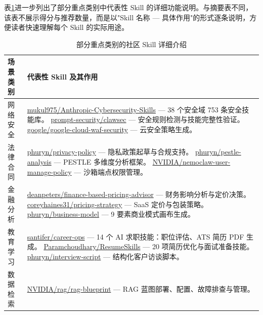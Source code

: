 \documentclass[UTF8,a4paper,12pt]{ctexart}
\begin{document}
表\ref{tab:community-detail}进一步列出了部分重点类别中代表性 Skill 的详细功能说明。与摘要表不同，该表不展示得分与推荐数量，而是以"Skill 名称 — 具体作用"的形式逐条说明，方便读者快速理解每个 Skill 的实际用途。

\begin{table}[H]
\centering
\caption{部分重点类别的社区 Skill 详细介绍}
\label{tab:community-detail}
\small
\begin{tabularx}{\textwidth}{p{2.8cm} X}
\toprule
场景类别 & 代表性 Skill 及其作用 \\
\midrule
网络安全 & \href{https://github.com/mukul975/Anthropic-Cybersecurity-Skills}{mukul975/Anthropic-Cybersecurity-Skills} — 38 个安全域 753 条安全技能库。
  \newline \href{https://github.com/prompt-security/clawsec}{prompt-security/clawsec} — 安全规则检测与技能完整性验证。
  \newline \href{https://github.com/google/skills/tree/main/skills/cloud/google-cloud-waf-security}{google/google-cloud-waf-security} — 云安全策略生成。\\
\addlinespace
法律合同 & \href{https://github.com/phuryn/pm-skills/tree/main/pm-toolkit/skills/privacy-policy}{phuryn/privacy-policy} — 隐私政策起草与合规支持。
  \newline \href{https://github.com/phuryn/pm-skills/tree/main/pm-product-strategy/skills/pestle-analysis}{phuryn/pestle-analysis} — PESTLE 多维度分析框架。
  \newline \href{https://github.com/NVIDIA/skills/tree/main/skills/NemoClaw/nemoclaw-user-manage-policy}{NVIDIA/nemoclaw-user-manage-policy} — 沙箱端点权限管理。\\
\addlinespace
金融分析 & \href{https://github.com/deanpeters/Product-Manager-Skills/tree/main/skills/finance-based-pricing-advisor}{deanpeters/finance-based-pricing-advisor} — 财务影响分析与定价决策。
  \newline \href{https://github.com/coreyhaines31/marketingskills/tree/main/skills/pricing-strategy}{coreyhaines31/pricing-strategy} — SaaS 定价与包装策略。
  \newline \href{https://github.com/phuryn/pm-skills/tree/main/pm-product-strategy/skills/business-model}{phuryn/business-model} — 9 要素商业模式画布生成。\\
\addlinespace
教育学习 & \href{https://github.com/santifer/career-ops}{santifer/career-ops} — 14 个 AI 求职技能：职位评估、ATS 简历 PDF 生成。
  \newline \href{https://github.com/Paramchoudhary/ResumeSkills}{Paramchoudhary/ResumeSkills} — 20 项简历优化与面试准备技能。
  \newline \href{https://github.com/phuryn/pm-skills/tree/main/pm-product-discovery/skills/interview-script}{phuryn/interview-script} — 结构化客户访谈脚本。\\
\addlinespace
数据检索 & \href{https://github.com/NVIDIA/skills/tree/main/skills/rag/rag-blueprint}{NVIDIA/rag/rag-blueprint} — RAG 蓝图部署、配置、故障排查与管理。\\
\bottomrule
\end{tabularx}
\end{table}
\end{document}
